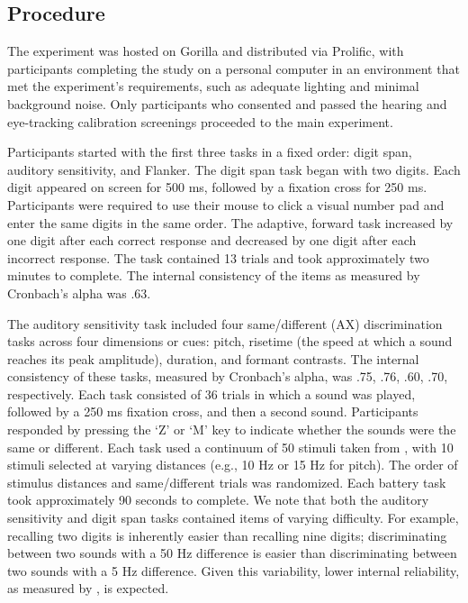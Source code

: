 \subsection{Procedure}

The experiment was hosted on Gorilla \citep{Anwyl-Irvine_2019} and distributed via Prolific, with participants completing the study on a personal computer in an environment that met the experiment’s requirements, such as adequate lighting and minimal background noise. Only participants who consented and passed the hearing and eye-tracking calibration screenings proceeded to the main experiment.

Participants started with the first three tasks in a fixed order: digit span, auditory sensitivity, and Flanker. The digit span task began with two digits. Each digit appeared on screen for 500 ms, followed by a fixation cross for 250 ms. Participants were required to use their mouse to click a visual number pad and enter the same digits in the same order. The adaptive, forward task increased by one digit after each correct response and decreased by one digit after each incorrect response. The task contained 13 trials and took approximately two minutes to complete. The internal consistency of the items as measured by Cronbach's alpha was .63. 

The auditory sensitivity task included four same/different (AX) discrimination tasks across four dimensions or cues:  pitch, risetime (the speed at which a sound reaches its peak amplitude), duration, and formant contrasts. The internal consistency of these tasks, measured by Cronbach’s alpha, was .75, .76, .60, .70, respectively. Each task consisted of 36 trials in which a sound was played, followed by a 250 ms fixation cross, and then a second sound. Participants responded by pressing the ‘Z’ or ‘M’ key to indicate whether the sounds were the same or different. Each task used a continuum of 50 stimuli taken from \citep{Kachlicka_Saito_Tierney_2019}, with 10 stimuli selected at varying distances (e.g., 10 Hz or 15 Hz for pitch). The order of stimulus distances and same/different trials was randomized. Each battery task took approximately 90 seconds to complete. We note that both the auditory sensitivity and digit span tasks contained items of varying difficulty. For example, recalling two digits is inherently easier than recalling nine digits; discriminating between two sounds with a 50 Hz difference is easier than discriminating between two sounds with a 5 Hz difference. Given this variability, lower internal reliability, as measured by \cite{Cronbach1951}, is expected. 

